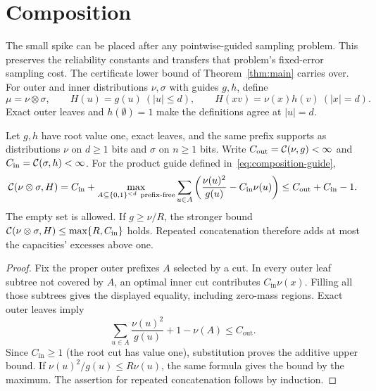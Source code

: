 \section{Composition}\label{sec:composition}
The small spike can be placed after any pointwise-guided sampling problem. This preserves the reliability constants and transfers that problem's fixed-error sampling cost. The certificate lower bound of Theorem~\ref{thm:main} carries over. For outer and inner distributions $\nu,\sigma$ with guides $g,h$, define
\begin{equation}\label{eq:composition-guide}
 \mu=\nu\otimes\sigma,\qquad
 H(u)=g(u)\ (|u|\le d),\qquad H(xv)=\nu(x)h(v)\ (|x|=d).
\end{equation}
Exact outer leaves and $h(\emptyset)=1$ make the definitions agree at $|u|=d$.

\begin{lemma}\label{lem:capacity-concatenation}
Let $g,h$ have root value one, exact leaves, and the same prefix supports as distributions $\nu$ on $d\ge1$ bits and $\sigma$ on $n\ge1$ bits. Write $C_{\mathrm{out}}=\mathcal C(\nu,g)<\infty$ and $C_{\mathrm{in}}=\mathcal C(\sigma,h)<\infty$. For the product guide defined in~\eqref{eq:composition-guide},
\begin{equation}\label{eq:capacity-concatenation}
 \mathcal C(\nu\otimes\sigma,H)
 =C_{\mathrm{in}}+
 \max_{A\subseteq\{0,1\}^{<d}\ \mathrm{prefix\text{-}free}}
 \sum_{u\in A}\left(\frac{\nu(u)^2}{g(u)}-C_{\mathrm{in}}\nu(u)\right)
 \le C_{\mathrm{out}}+C_{\mathrm{in}}-1.
\end{equation}
The empty set is allowed. If $g\ge\nu/R$, the stronger bound $\mathcal C(\nu\otimes\sigma,H)\le\max\{R,C_{\mathrm{in}}\}$ holds. Repeated concatenation therefore adds at most the capacities' excesses above one.
\end{lemma}
\begin{proof}
Fix the proper outer prefixes $A$ selected by a cut. In every outer leaf subtree not covered by $A$, an optimal inner cut contributes $C_{\mathrm{in}}\nu(x)$. Filling all those subtrees gives the displayed equality, including zero-mass regions. Exact outer leaves imply
\[
 \sum_{u\in A}\frac{\nu(u)^2}{g(u)}+1-\nu(A)\le C_{\mathrm{out}}.
\]
Since $C_{\mathrm{in}}\ge1$ (the root cut has value one), substitution proves the additive upper bound. If $\nu(u)^2/g(u)\le R\nu(u)$, the same formula gives the bound by the maximum. The assertion for repeated concatenation follows by induction.
\end{proof}

